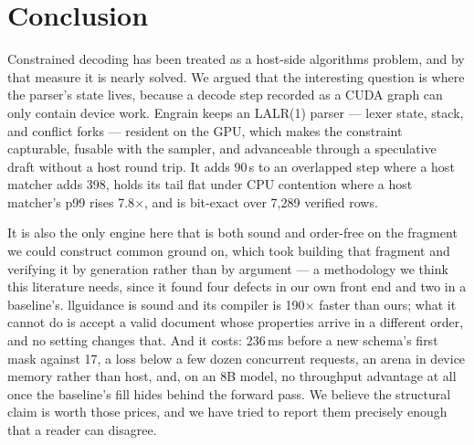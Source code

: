 \documentclass{article}
\begin{document}
\section{Conclusion}

Constrained decoding has been treated as a host-side algorithms problem, and by
that measure it is nearly solved. We argued that the interesting question is
where the parser's state lives, because a decode step recorded as a CUDA graph
can only contain device work. Engrain keeps an LALR(1) parser --- lexer state,
stack, and conflict forks --- resident on the GPU, which makes the constraint
capturable, fusable with the sampler, and advanceable through a speculative
draft without a host round trip. It adds 90\,\textmu{}s to an overlapped step
where a host matcher adds 398, holds its tail flat under CPU contention where a
host matcher's p99 rises 7.8$\times$, and is bit-exact over 7{,}289 verified
rows.

It is also the only engine here that is both sound and order-free on the
fragment we could construct common ground on, which took building that fragment
and verifying it by generation rather than by argument --- a methodology we
think this literature needs, since it found four defects in our own front end
and two in a baseline's. llguidance is sound and its compiler is 190$\times$
faster than ours; what it cannot do is accept a valid document whose properties
arrive in a different order, and no setting changes that. And it costs: 236\,ms before a new schema's first mask
against 17, a loss below a few dozen concurrent requests, an arena in device
memory rather than host, and, on an 8B model, no throughput advantage at all
once the baseline's fill hides behind the forward pass. We believe the
structural claim is worth those prices, and we have tried to report them
precisely enough that a reader can disagree.



\end{document}
